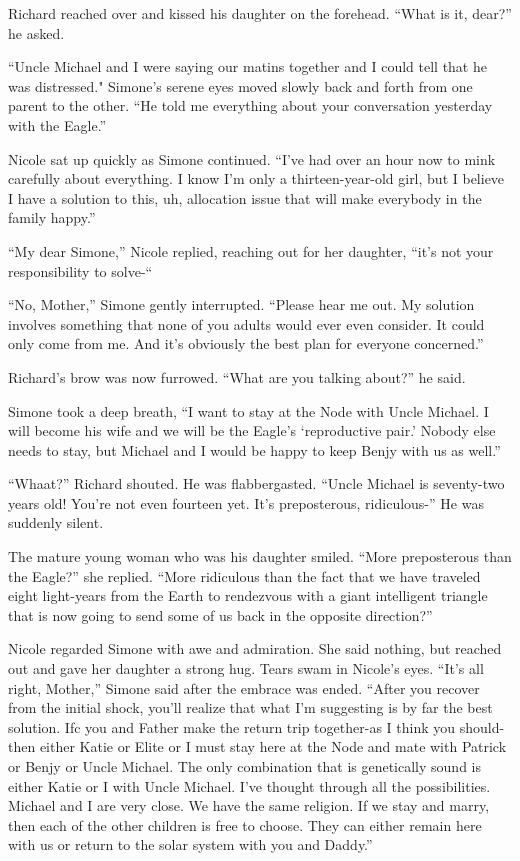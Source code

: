 \documentclass[]{article}
\begin{document}
{Richard reached over and kissed his daughter on the forehead.  “What is it, dear?” he asked.

“Uncle Michael and I were saying our matins together and I could tell that he was distressed."  Simone’s serene eyes moved slowly back and forth from one parent to the other.  “He told me everything about your conversation yesterday with the Eagle.”

Nicole sat up quickly as Simone continued.  “I’ve had over an hour now to mink carefully about everything.  I know I’m only a thirteen-year-old girl, but I believe I have a solution to this, uh, allocation issue that will make everybody in the family happy.”

“My dear Simone,” Nicole replied, reaching out for her daughter, “it’s not your responsibility to solve-“

“No, Mother,” Simone gently interrupted.  “Please hear me out.  My solution involves something that none of you adults would ever even consider.  It could only come from me.  And it’s obviously the best plan for everyone concerned.”

Richard’s brow was now furrowed.  “What are you talking about?” he said.

Simone took a deep breath, “I want to stay at the Node with Uncle Michael.  I will become his wife and we will be the Eagle’s ‘reproductive pair.’ Nobody else needs to stay, but Michael and I would be happy to keep Benjy with us as well.”

“Whaat?” Richard shouted.  He was flabbergasted.  “Uncle Michael is seventy-two years old! You’re not even fourteen yet.  It’s preposterous, ridiculous-” He was suddenly silent.

The mature young woman who was his daughter smiled.  “More preposterous than the Eagle?” she replied.  “More ridiculous than the fact that we have traveled eight light-years from the Earth to rendezvous with a giant intelligent triangle that is now going to send some of us back in the opposite direction?”

Nicole regarded Simone with awe and admiration.  She said nothing, but reached out and gave her daughter a strong hug.  Tears swam in Nicole’s eyes.  “It’s all right, Mother,” Simone said after the embrace was ended.  “After you recover from the initial shock, you’ll realize that what I’m suggesting is by far the best solution.  Ifc you and Father make the return trip together-as I think you should-then either Katie or Elite or I must stay here at the Node and mate with Patrick or Benjy or Uncle Michael.  The only combination that is genetically sound is either Katie or I with Uncle Michael.  I’ve thought through all the possibilities.  Michael and I are very close.  We have the same religion.  If we stay and marry, then each of the other children is free to choose.  They can either remain here with us or return to the solar system with you and Daddy.”

}
\end{document}
